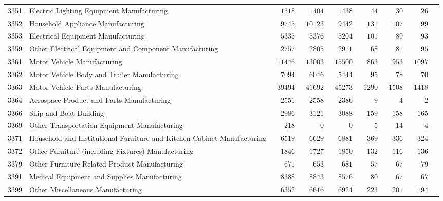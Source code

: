 \documentclass[9pt, oneside]{article}   	%
\begin{document}
\begin{longtable}{lp{3 in}ccccccc}
3351  & Electric Lighting Equipment Manufacturing & $\phantom{00}1518$ & $\phantom{00}1404$ & $\phantom{00}1438$ & $\phantom{000}44$ & $\phantom{000}30$ & $\phantom{000}26$ \\
3352  & Household Appliance Manufacturing & $\phantom{00}9745$ & $\phantom{0}10123$ & $\phantom{00}9442$ & $\phantom{00}131$ & $\phantom{00}107$ & $\phantom{000}99$ \\
3353  & Electrical Equipment Manufacturing & $\phantom{00}5335$ & $\phantom{00}5376$ & $\phantom{00}5204$ & $\phantom{00}101$ & $\phantom{000}89$ & $\phantom{000}93$ \\
3359  & Other Electrical Equipment and Component Manufacturing & $\phantom{00}2757$ & $\phantom{00}2805$ & $\phantom{00}2911$ & $\phantom{000}68$ & $\phantom{000}81$ & $\phantom{000}95$ \\

3361  & Motor Vehicle Manufacturing & $\phantom{0}11446$ & $\phantom{0}13003$ & $\phantom{0}15500$ & $\phantom{00}863$ & $\phantom{00}953$ & $\phantom{0}1097$ \\
3362  & Motor Vehicle Body and Trailer Manufacturing & $\phantom{00}7094$ & $\phantom{00}6046$ & $\phantom{00}5444$ & $\phantom{000}95$ & $\phantom{000}78$ & $\phantom{000}70$ \\
3363  & Motor Vehicle Parts Manufacturing & $\phantom{0}39494$ & $\phantom{0}41692$ & $\phantom{0}45273$ & $\phantom{0}1290$ & $\phantom{0}1508$ & $\phantom{0}1418$ \\
3364  & Aerospace Product and Parts Manufacturing & $\phantom{00}2551$ & $\phantom{00}2558$ & $\phantom{00}2386$ & $\phantom{0000}9$ & $\phantom{0000}4$ & $\phantom{0000}2$ \\
3366  & Ship and Boat Building & $\phantom{00}2986$ & $\phantom{00}3121$ & $\phantom{00}3088$ & $\phantom{00}159$ & $\phantom{00}158$ & $\phantom{00}165$ \\
3369  & Other Transportation Equipment Manufacturing & $\phantom{000}218$ & $\phantom{00000}0$ & $\phantom{00000}0$ & $\phantom{0000}5$ & $\phantom{000}14$ & $\phantom{0000}4$ \\
3371  & Household and Institutional Furniture and Kitchen Cabinet Manufacturing & $\phantom{00}6519$ & $\phantom{00}6629$ & $\phantom{00}6881$ & $\phantom{00}369$ & $\phantom{00}336$ & $\phantom{00}324$ \\
3372  & Office Furniture (including Fixtures) Manufacturing & $\phantom{00}1846$ & $\phantom{00}1727$ & $\phantom{00}1850$ & $\phantom{00}132$ & $\phantom{00}116$ & $\phantom{00}136$ \\
3379  & Other Furniture Related Product Manufacturing & $\phantom{000}671$ & $\phantom{000}653$ & $\phantom{000}681$ & $\phantom{000}57$ & $\phantom{000}67$ & $\phantom{000}79$ \\
3391  & Medical Equipment and Supplies Manufacturing & $\phantom{00}8388$ & $\phantom{00}8843$ & $\phantom{00}8576$ & $\phantom{000}80$ & $\phantom{000}67$ & $\phantom{000}67$ \\
3399  & Other Miscellaneous Manufacturing & $\phantom{00}6352$ & $\phantom{00}6616$ & $\phantom{00}6924$ & $\phantom{00}223$ & $\phantom{00}201$ & $\phantom{00}194$ \\


\end{longtable}
\end{document}
